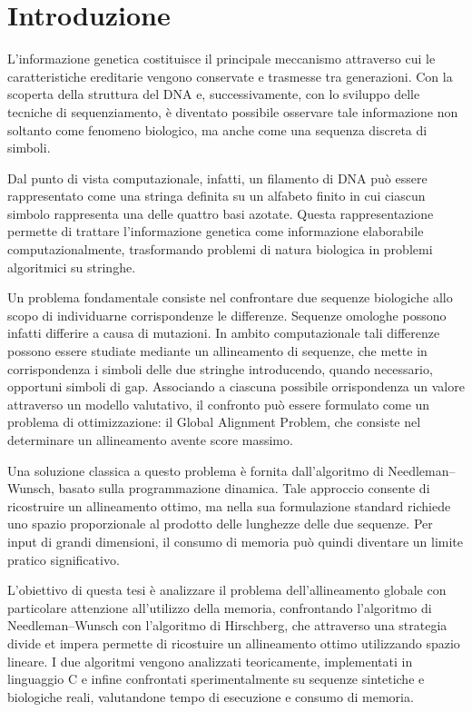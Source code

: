 \section{Introduzione}

L'informazione genetica costituisce il principale meccanismo attraverso cui le caratteristiche ereditarie vengono conservate e trasmesse
tra generazioni. Con la scoperta della struttura del DNA e, successivamente, con lo sviluppo delle tecniche di sequenziamento, è diventato
possibile osservare tale informazione non soltanto come fenomeno biologico, ma anche come una sequenza discreta di simboli.

Dal punto di vista computazionale, infatti, un filamento di DNA può essere rappresentato come una stringa definita su un alfabeto finito
in cui ciascun simbolo rappresenta una delle quattro basi azotate. Questa rappresentazione permette di trattare l'informazione genetica
come informazione elaborabile computazionalmente, trasformando problemi di natura biologica in problemi algoritmici su stringhe.

Un problema fondamentale consiste nel confrontare due sequenze biologiche allo scopo di individuarne corrispondenze le differenze.
Sequenze omologhe possono infatti differire a causa di mutazioni. In ambito computazionale tali differenze possono
essere studiate mediante un allineamento di sequenze, che mette in corrispondenza i simboli delle due stringhe introducendo, quando necessario,
opportuni simboli di gap. Associando a ciascuna possibile orrispondenza un valore attraverso un modello valutativo, il confronto può essere formulato
come un problema di ottimizzazione: il Global Alignment Problem, che consiste nel determinare un allineamento avente score massimo.

Una soluzione classica a questo problema è fornita dall'algoritmo di Needleman--Wunsch, basato sulla programmazione dinamica.
Tale approccio consente di ricostruire un allineamento ottimo, ma nella sua formulazione standard richiede uno spazio proporzionale al prodotto
delle lunghezze delle due sequenze.
Per input di grandi dimensioni, il consumo di memoria può quindi diventare un limite pratico significativo.

L'obiettivo di questa tesi è analizzare il problema dell'allineamento globale con particolare attenzione all'utilizzo della memoria, confrontando
l'algoritmo di Needleman--Wunsch con l'algoritmo di Hirschberg, che attraverso una strategia divide et impera permette di ricostuire un allineamento
ottimo utilizzando spazio lineare. I due algoritmi vengono analizzati teoricamente, implementati in linguaggio C e infine confrontati sperimentalmente
su sequenze sintetiche e biologiche reali, valutandone tempo di esecuzione e consumo di memoria.
